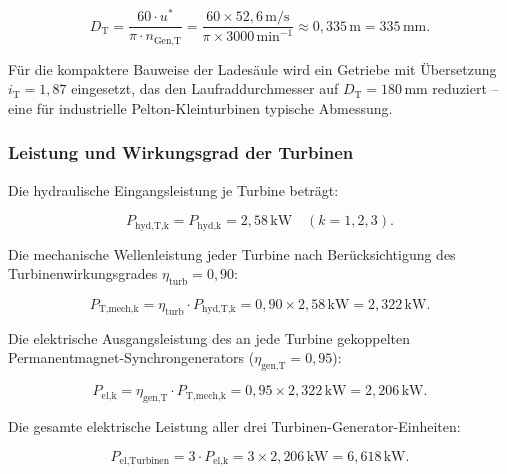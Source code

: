 ﻿\documentclass[a4paper,12pt]{article}
\begin{document}
\begin{equation}
  D_\text{T} = \frac{60 \cdot u^*}{\pi \cdot n_\text{Gen,T}}
             = \frac{60 \times 52{,}6\,\text{m/s}}{\pi \times 3000\,\text{min}^{-1}}
             \approx 0{,}335\,\text{m} = 335\,\text{mm}.
  \label{eq:D_T}
\end{equation}

Für die kompaktere Bauweise der Ladesäule wird ein Getriebe mit Übersetzung
$i_\text{T} = 1{,}87$ eingesetzt, das den Laufraddurchmesser auf
$D_\text{T} = 180\,\text{mm}$ reduziert -- eine für industrielle Pelton-Kleinturbinen
typische Abmessung.

\subsubsection{Leistung und Wirkungsgrad der Turbinen}

Die hydraulische Eingangsleistung je Turbine beträgt:

\begin{equation}
  P_\text{hyd,T,k} = P_\text{hyd,k} = 2{,}58\,\text{kW} \quad (k = 1, 2, 3).
  \label{eq:P_hyd_T}
\end{equation}

Die mechanische Wellenleistung jeder Turbine nach Berücksichtigung des
Turbinenwirkungsgrades $\eta_\text{turb} = 0{,}90$:

\begin{equation}
  P_\text{T,mech,k} = \eta_\text{turb} \cdot P_\text{hyd,T,k}
                    = 0{,}90 \times 2{,}58\,\text{kW}
                    = 2{,}322\,\text{kW}.
  \label{eq:P_turb_mech}
\end{equation}

Die elektrische Ausgangsleistung des an jede Turbine gekoppelten
Permanentmagnet-Synchrongenerators ($\eta_\text{gen,T} = 0{,}95$):

\begin{equation}
  P_\text{el,k} = \eta_\text{gen,T} \cdot P_\text{T,mech,k}
               = 0{,}95 \times 2{,}322\,\text{kW}
               = 2{,}206\,\text{kW}.
  \label{eq:P_el_T}
\end{equation}

Die gesamte elektrische Leistung aller drei Turbinen-Generator-Einheiten:

\begin{equation}
  P_\text{el,Turbinen} = 3 \cdot P_\text{el,k}
                       = 3 \times 2{,}206\,\text{kW}
                       = 6{,}618\,\text{kW}.
  \label{eq:P_el_turbinen_ges}
\end{equation}
\end{document}
